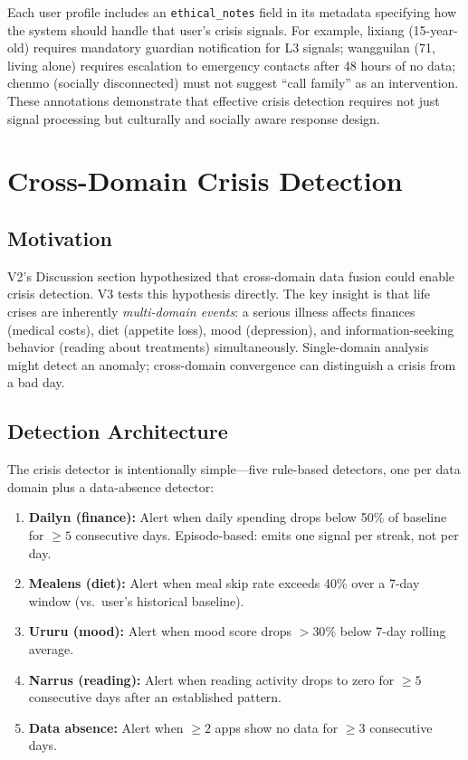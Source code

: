 \documentclass[11pt,a4paper]{article}
\begin{document}
Each user profile includes an \texttt{ethical\_notes} field in its metadata
specifying how the system should handle that user's crisis signals. For
example, lixiang (15-year-old) requires mandatory guardian notification for
L3 signals; wangguilan (71, living alone) requires escalation to emergency
contacts after 48 hours of no data; chenmo (socially disconnected) must not
suggest ``call family'' as an intervention. These annotations demonstrate
that effective crisis detection requires not just signal processing but
culturally and socially aware response design.


\section{Cross-Domain Crisis Detection}
\label{sec:crisis}

\subsection{Motivation}

V2's Discussion section hypothesized that cross-domain data fusion could
enable crisis detection. V3 tests this hypothesis directly. The key insight
is that life crises are inherently \emph{multi-domain events}: a serious
illness affects finances (medical costs), diet (appetite loss), mood
(depression), and information-seeking behavior (reading about treatments)
simultaneously. Single-domain analysis might detect an anomaly; cross-domain
convergence can distinguish a crisis from a bad day.

\subsection{Detection Architecture}

The crisis detector is intentionally simple---five rule-based detectors, one
per data domain plus a data-absence detector:

\begin{enumerate}[leftmargin=*,itemsep=2pt]
  \item \textbf{Dailyn (finance):} Alert when daily spending drops below 50\%
    of baseline for $\geq 5$ consecutive days. Episode-based: emits one signal
    per streak, not per day.
  \item \textbf{Mealens (diet):} Alert when meal skip rate exceeds 40\% over
    a 7-day window (vs.\ user's historical baseline).
  \item \textbf{Ururu (mood):} Alert when mood score drops $> 30\%$ below
    7-day rolling average.
  \item \textbf{Narrus (reading):} Alert when reading activity drops to zero
    for $\geq 5$ consecutive days after an established pattern.
  \item \textbf{Data absence:} Alert when $\geq 2$ apps show no data for
    $\geq 3$ consecutive days.
\end{enumerate}
\end{document}
